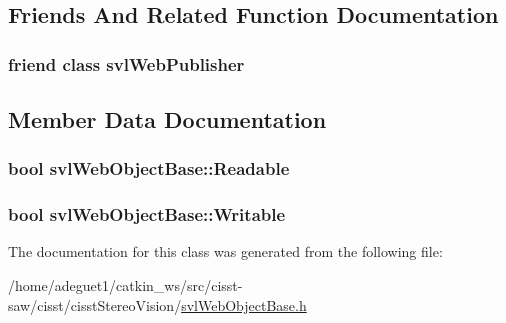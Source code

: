 \subsection{Friends And Related Function Documentation}
\hypertarget{classsvl_web_object_base_a5da5a059398f07bd737af2dae959acfa}{
\subsubsection[{svl\-Web\-Publisher}]{\setlength{\rightskip}{0pt plus 5cm}friend class {\bf svl\-Web\-Publisher}\hspace{0.3cm}{\ttfamily [friend]}}}\label{classsvl_web_object_base_a5da5a059398f07bd737af2dae959acfa}


\subsection{Member Data Documentation}
\hypertarget{classsvl_web_object_base_a6e60e80b45caae93a766426f7aa13124}{
\subsubsection[{Readable}]{\setlength{\rightskip}{0pt plus 5cm}bool svl\-Web\-Object\-Base\-::\-Readable\hspace{0.3cm}{\ttfamily [protected]}}}\label{classsvl_web_object_base_a6e60e80b45caae93a766426f7aa13124}
\hypertarget{classsvl_web_object_base_a515395da928c86641270ece2ab7c1188}{
\subsubsection[{Writable}]{\setlength{\rightskip}{0pt plus 5cm}bool svl\-Web\-Object\-Base\-::\-Writable\hspace{0.3cm}{\ttfamily [protected]}}}\label{classsvl_web_object_base_a515395da928c86641270ece2ab7c1188}


The documentation for this class was generated from the following file\-:\begin{DoxyCompactItemize}
\item 
/home/adeguet1/catkin\-\_\-ws/src/cisst-\/saw/cisst/cisst\-Stereo\-Vision/\hyperlink{svl_web_object_base_8h}{svl\-Web\-Object\-Base.\-h}\end{DoxyCompactItemize}
